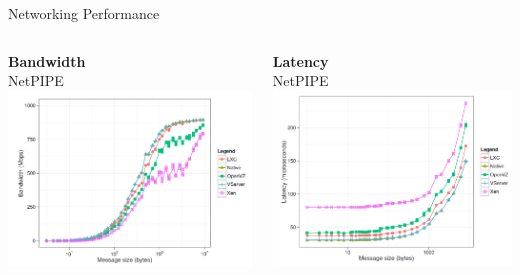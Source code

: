 \begin{frame}{Networking Performance}
	\begin{columns}[T]
		\begin{column}{.5\textwidth}
			\begin{block}{\centering \textbf{Bandwidth} \\ NetPIPE}
				\includegraphics[width=\textwidth]{img/net_bandwidth_netpipe.png}
			\end{block}
		\end{column}
		\begin{column}{.5\textwidth}
			\begin{block}{\centering \textbf{Latency} \\ NetPIPE}
				\includegraphics[width=\textwidth]{img/net_latency_netpipe.png}
			\end{block}
		\end{column}
	\end{columns}
\end{frame}

